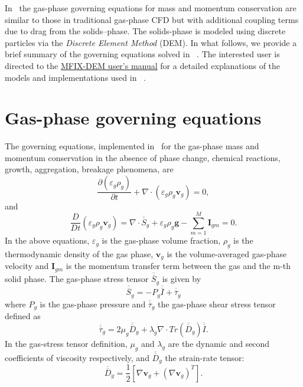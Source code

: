 In \mfix\ the gas-phase governing equations for mass and momentum
conservation are similar to those in traditional gas-phase CFD
but with additional coupling terms due to drag from the solids–phase.
The solids-phase is modeled using discrete particles via the
\emph{Discrete Element Method} (DEM). In what follows, we provide
a brief summary of the governing equations solved in \mfix\ .
The interested user is directed to the 
\href{https://mfix.netl.doe.gov/download/mfix/mfix_current_documentation/dem_doc_2012-1.pdf}{MFIX-DEM user's manual}
for a detailed explanations of the models and implementations used in
\mfix\ .

\section{Gas-phase governing equations}
The governing equations, implemented in \mfix\ for the gas-phase mass
and momentum conservation in the absence of phase change, chemical
reactions, growth, aggregation, breakage phenomena, are
\begin{equation}
  \dfrac{\partial (\varepsilon_g\rho_g) }{\partial t} +\nabla\cdot(\varepsilon_g\rho_g\boldsymbol v_g) = 0,
\end{equation}
and 
\begin{equation}
  \dfrac{D}{D t}(\varepsilon_g\rho_g\boldsymbol v_g) =
  \nabla\cdot \overline{\overline{S}}_g + \varepsilon_g\rho_g\boldsymbol g - \sum\limits_{m=1}^M \boldsymbol I _{gm} = 0.
\end{equation}
In the above equations, $\varepsilon_g$ is the gas-phase 
volume fraction, $\rho_g$ is the thermodynamic density of
the gas phase, $\boldsymbol v_g$ is the volume-averaged gas-phase
velocity and  $\boldsymbol I_{gm}$ is the momentum transfer term
between the gas and the m-th solid phase. The gas-phase stress tensor 
$\overline{\overline{S}}_g$ is given by
\begin{equation}
  \overline{\overline{S}}_g = -P_g  \overline{\overline{I}} +  \overline{\overline{\tau}}_g
\end{equation}
where $P_g$ is the gas-phase pressure and $\overline{\overline{\tau}}_g$ the gas-phase shear
stress tensor defined as
\begin{equation}
  \overline{\overline{\tau}}_g = 2\mu_g \overline{\overline{D}}_g  +\lambda_g \nabla\cdot Tr(\overline{\overline{D}}_g )
  \overline{\overline{I}}.
\end{equation}
In the gas-stress tensor definition, $\mu_g$ and $\lambda_g$ are the dynamic
and second coefficients of viscosity respectively, and
$\overline{\overline{D}}_g$ the strain-rate tensor:
\begin{equation}
  \overline{\overline{D}}_g = \dfrac{1}{2}\left[\nabla\boldsymbol v_g + (\nabla\boldsymbol v_g)^T\right].
\end{equation}
